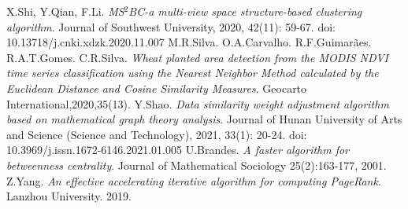 \documentclass[12pt]{article}
\begin{document}
{\begin{thebibliography}{99}
	 X.Shi, Y.Qian, F.Li. \emph{MS$^{2}$BC-a multi-view space structure-based clustering algorithm}. Journal of Southwest University, 2020, 42(11): 59-67. doi: 10.13718/j.cnki.xdzk.2020.11.007
	 M.R.Silva. O.A.Carvalho. R.F.Guimarães. R.A.T.Gomes. C.R.Silva. \emph{Wheat planted area detection from the MODIS NDVI time series classification using the Nearest Neighbor Method calculated by the Euclidean Distance and Cosine Similarity Measures}. Geocarto International,2020,35(13).
	 Y.Shao. \emph{Data similarity weight adjustment algorithm based on mathematical graph theory analysis}. Journal of Hunan University of Arts and Science (Science and Technology), 2021, 33(1): 20-24. doi: 10.3969/j.issn.1672-6146.2021.01.005
	 U.Brandes. \emph{A faster algorithm for betweenness centrality}. Journal of Mathematical Sociology 25(2):163-177, 2001.
	 Z.Yang. \emph{An effective accelerating iterative algorithm for computing PageRank}. Lanzhou University. 2019.
\end{thebibliography}
\clearpage
}
\end{document}
